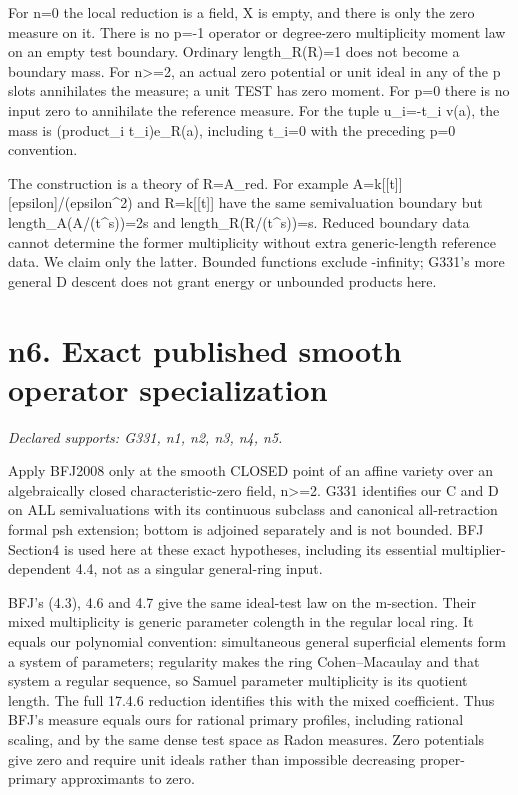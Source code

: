 \documentclass[11pt]{article}
\begin{document}
For n=0 the local reduction is a field, X is empty, and there is only the zero measure on it. There is no p=-1 operator or degree-zero multiplicity moment law on an empty test boundary. Ordinary length\_R(R)=1 does not become a boundary mass. For n>=2, an actual zero potential or unit ideal in any of the p slots annihilates the measure; a unit TEST has zero moment. For p=0 there is no input zero to annihilate the reference measure. For the tuple u\_i=-t\_i v(a), the mass is (product\_i t\_i)e\_R(a), including t\_i=0 with the preceding p=0 convention.

The construction is a theory of R=A\_red. For example A=k[[t]][epsilon]/(epsilon\textasciicircum{}2) and R=k[[t]] have the same semivaluation boundary but length\_A(A/(t\textasciicircum{}s))=2s and length\_R(R/(t\textasciicircum{}s))=s. Reduced boundary data cannot determine the former multiplicity without extra generic-length reference data. We claim only the latter. Bounded functions exclude -infinity; G331's more general D descent does not grant energy or unbounded products here.

\section{n6. Exact published smooth operator specialization}
\textit{Declared supports: G331, n1, n2, n3, n4, n5.}

Apply BFJ2008 only at the smooth CLOSED point of an affine variety over an algebraically closed characteristic-zero field, n>=2. G331 identifies our C and D on ALL semivaluations with its continuous subclass and canonical all-retraction formal psh extension; bottom is adjoined separately and is not bounded. BFJ Section4 is used here at these exact hypotheses, including its essential multiplier-dependent 4.4, not as a singular general-ring input.

BFJ's (4.3), 4.6 and 4.7 give the same ideal-test law on the m-section. Their mixed multiplicity is generic parameter colength in the regular local ring. It equals our polynomial convention: simultaneous general superficial elements form a system of parameters; regularity makes the ring Cohen--Macaulay and that system a regular sequence, so Samuel parameter multiplicity is its quotient length. The full 17.4.6 reduction identifies this with the mixed coefficient. Thus BFJ's measure equals ours for rational primary profiles, including rational scaling, and by the same dense test space as Radon measures. Zero potentials give zero and require unit ideals rather than impossible decreasing proper-primary approximants to zero.
\end{document}
